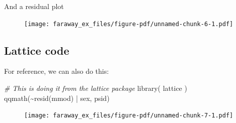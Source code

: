 \documentclass[
  letterpaper,
  DIV=11,
  numbers=noendperiod]{scrreprt}
\newenvironment{Shaded}{\begin{snugshade}}{\end{snugshade}}
\newcommand{\AttributeTok}[1]{\textcolor[rgb]{0.49,0.56,0.16}{#1}}
\newcommand{\CommentTok}[1]{\textcolor[rgb]{0.38,0.63,0.69}{\textit{#1}}}
\newcommand{\DecValTok}[1]{\textcolor[rgb]{0.25,0.63,0.44}{#1}}
\newcommand{\FloatTok}[1]{\textcolor[rgb]{0.25,0.63,0.44}{#1}}
\newcommand{\FunctionTok}[1]{\textcolor[rgb]{0.02,0.16,0.49}{#1}}
\newcommand{\NormalTok}[1]{\textcolor[rgb]{0.00,0.44,0.13}{#1}}
\newcommand{\OtherTok}[1]{\textcolor[rgb]{0.00,0.44,0.13}{#1}}
\newcommand{\SpecialCharTok}[1]{\textcolor[rgb]{0.25,0.44,0.63}{#1}}
\newcommand{\StringTok}[1]{\textcolor[rgb]{0.25,0.44,0.63}{#1}}
\begin{document}
And a residual plot

\begin{Shaded}
\end{Shaded}

\begin{figure}[H]

{\centering \texttt{[image: faraway\_ex\_files/figure-pdf/unnamed-chunk-6-1.pdf]}

}

\end{figure}

\hypertarget{lattice-code}{%
\subsection{Lattice code}\label{lattice-code}}

For reference, we can also do this:

\begin{Shaded}
\begin{Highlighting}[]
\CommentTok{\# This is doing it from the lattice package}
\FunctionTok{library}\NormalTok{( lattice )}
\FunctionTok{qqmath}\NormalTok{(}\SpecialCharTok{\textasciitilde{}}\FunctionTok{resid}\NormalTok{(mmod) }\SpecialCharTok{|}\NormalTok{ sex, psid)}
\end{Highlighting}
\end{Shaded}

\begin{figure}[H]

{\centering \texttt{[image: faraway\_ex\_files/figure-pdf/unnamed-chunk-7-1.pdf]}

}

\end{figure}
\end{document}
